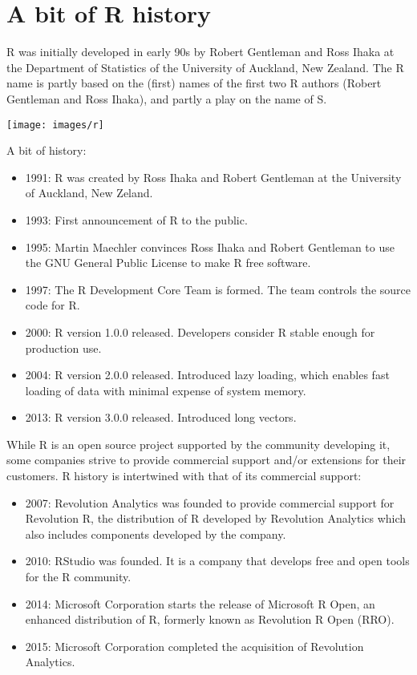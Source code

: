 \documentclass[]{book}
\providecommand{\tightlist}{%
  \setlength{\itemsep}{0pt}\setlength{\parskip}{0pt}}
\def\tightlist{}
\begin{document}
\section{A bit of R history}\label{a-bit-of-r-history}

R was initially developed in early 90s by Robert Gentleman and Ross
Ihaka at the Department of Statistics of the University of Auckland, New
Zealand. The R name is partly based on the (first) names of the first
two R authors (Robert Gentleman and Ross Ihaka), and partly a play on
the name of S.

\texttt{[image: images/r]}

A bit of history:

\begin{itemize}
\tightlist
\item
  1991: R was created by Ross Ihaka and Robert Gentleman at the
  University of Auckland, New Zeland.
\item
  1993: First announcement of R to the public.
\item
  1995: Martin Maechler convinces Ross Ihaka and Robert Gentleman to use
  the GNU General Public License to make R free software.
\item
  1997: The R Development Core Team is formed. The team controls the
  source code for R.
\item
  2000: R version 1.0.0 released. Developers consider R stable enough
  for production use.
\item
  2004: R version 2.0.0 released. Introduced lazy loading, which enables
  fast loading of data with minimal expense of system memory.
\item
  2013: R version 3.0.0 released. Introduced long vectors.
\end{itemize}

While R is an open source project supported by the community developing
it, some companies strive to provide commercial support and/or
extensions for their customers. R history is intertwined with that of
its commercial support:

\begin{itemize}
\tightlist
\item
  2007: Revolution Analytics was founded to provide commercial support
  for Revolution R, the distribution of R developed by Revolution
  Analytics which also includes components developed by the company.
\item
  2010: RStudio was founded. It is a company that develops free and open
  tools for the R community.
\item
  2014: Microsoft Corporation starts the release of Microsoft R Open, an
  enhanced distribution of R, formerly known as Revolution R Open (RRO).
\item
  2015: Microsoft Corporation completed the acquisition of Revolution
  Analytics.
\end{itemize}
\end{document}
